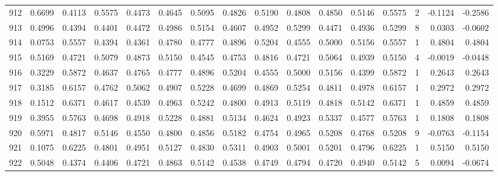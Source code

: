 \begin{tabular}{lrrrrrrrrrrrrrrr}
912 &      0.6699 &  0.4113 &  0.5575 &  0.4473 &  0.4645 &  0.5095 &  0.4826 &  0.5190 &  0.4808 &  0.4850 &   0.5146 &     0.5575 &      2 &                   -0.1124 &                    -0.2586 \\
913 &      0.4996 &  0.4394 &  0.4401 &  0.4472 &  0.4986 &  0.5154 &  0.4607 &  0.4952 &  0.5299 &  0.4471 &   0.4936 &     0.5299 &      8 &                    0.0303 &                    -0.0602 \\
914 &      0.0753 &  0.5557 &  0.4394 &  0.4361 &  0.4780 &  0.4777 &  0.4896 &  0.5204 &  0.4555 &  0.5000 &   0.5156 &     0.5557 &      1 &                    0.4804 &                     0.4804 \\
915 &      0.5169 &  0.4721 &  0.5079 &  0.4873 &  0.5150 &  0.4545 &  0.4753 &  0.4816 &  0.4721 &  0.5064 &   0.4939 &     0.5150 &      4 &                   -0.0019 &                    -0.0448 \\
916 &      0.3229 &  0.5872 &  0.4637 &  0.4765 &  0.4777 &  0.4896 &  0.5204 &  0.4555 &  0.5000 &  0.5156 &   0.4399 &     0.5872 &      1 &                    0.2643 &                     0.2643 \\
917 &      0.3185 &  0.6157 &  0.4762 &  0.5062 &  0.4907 &  0.5228 &  0.4699 &  0.4869 &  0.5254 &  0.4811 &   0.4978 &     0.6157 &      1 &                    0.2972 &                     0.2972 \\
918 &      0.1512 &  0.6371 &  0.4617 &  0.4539 &  0.4963 &  0.5242 &  0.4800 &  0.4913 &  0.5119 &  0.4818 &   0.5142 &     0.6371 &      1 &                    0.4859 &                     0.4859 \\
919 &      0.3955 &  0.5763 &  0.4698 &  0.4918 &  0.5228 &  0.4881 &  0.5134 &  0.4624 &  0.4923 &  0.5337 &   0.4577 &     0.5763 &      1 &                    0.1808 &                     0.1808 \\
920 &      0.5971 &  0.4817 &  0.5146 &  0.4550 &  0.4800 &  0.4856 &  0.5182 &  0.4754 &  0.4965 &  0.5208 &   0.4768 &     0.5208 &      9 &                   -0.0763 &                    -0.1154 \\
921 &      0.1075 &  0.6225 &  0.4801 &  0.4951 &  0.5127 &  0.4830 &  0.5311 &  0.4903 &  0.5001 &  0.5201 &   0.4796 &     0.6225 &      1 &                    0.5150 &                     0.5150 \\
922 &      0.5048 &  0.4374 &  0.4406 &  0.4721 &  0.4863 &  0.5142 &  0.4538 &  0.4749 &  0.4794 &  0.4720 &   0.4940 &     0.5142 &      5 &                    0.0094 &                    -0.0674 \\

\end{tabular}

